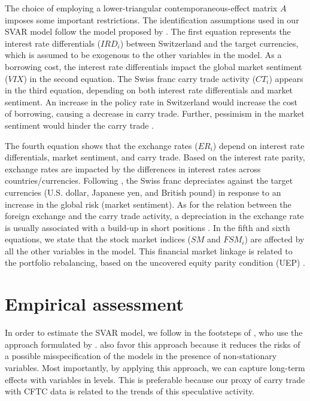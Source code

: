 \documentclass[a4paper, twoside]{templates/ociamthesis}
\begin{document}
The choice of employing a lower-triangular contemporaneous-effect matrix \(A\) imposes some important restrictions. The identification assumptions used in our SVAR model follow the model proposed by \textcite{nishigaki2007}. The first equation represents the interest rate differentials (\(IRD_{i}\)) between Switzerland and the target currencies, which is assumed to be exogenous to the other variables in the model. As a borrowing cost, the interest rate differentials impact the global market sentiment (\(VIX\)) in the second equation. The Swiss franc carry trade activity (\(CT_{i}\)) appears in the third equation, depending on both interest rate differentials and market sentiment. An increase in the policy rate in Switzerland would increase the cost of borrowing, causing a decrease in carry trade. Further, pessimism in the market sentiment would hinder the carry trade \autocite{brunnermeier2008}.

The fourth equation shows that the exchange rates (\(ER_{i}\)) depend on interest rate differentials, market sentiment, and carry trade. Based on the interest rate parity, exchange rates are impacted by the differences in interest rates across countries/currencies. Following \textcite{grisse2015}, the Swiss franc depreciates against the target currencies (U.S. dollar, Japanese yen, and British pound) in response to an increase in the global risk (market sentiment). As for the relation between the foreign exchange and the carry trade activity, a depreciation in the exchange rate is usually associated with a build-up in short positions \autocite{mogford2006}. In the fifth and sixth equations, we state that the stock market indices (\(SM\) and \(FSM_{i}\)) are affected by all the other variables in the model. This financial market linkage is related to the portfolio rebalancing, based on the uncovered equity parity condition (UEP) \autocite{curcuru2014,girardin2019}.

\hypertarget{fourthree}{%
\section{Empirical assessment}\label{fourthree}}

In order to estimate the SVAR model, we follow in the footsteps of \textcite{chen2016}, who use the approach formulated by \textcite{toda1995}. \textcite{amiri2012} also favor this approach because it reduces the risks of a possible misspecification of the models in the presence of non-stationary variables. Most importantly, by applying this approach, we can capture long-term effects with variables in levels. This is preferable because our proxy of carry trade with CFTC data is related to the trends of this speculative activity.
\end{document}
